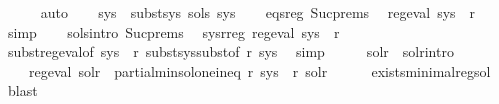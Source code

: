 \begin{isabellebody}
\ \ \ \ \isamarkupfalse%
\ auto\isanewline
\ \ \isamarkupfalse%
\ {\isacharquery}{\kern0pt}sys{\isacharprime}{\kern0pt}\ {\isacharequal}{\kern0pt}\ {\isachardoublequoteopen}subst{\isacharunderscore}{\kern0pt}sys\ sols\ sys{\isachardoublequoteclose}\isanewline
\ \ \isamarkupfalse%
\ eqs{\isacharunderscore}{\kern0pt}reg\ Suc{\isachardot}{\kern0pt}prems\ \isamarkupfalse%
\ {\isachardoublequoteopen}reg{\isacharunderscore}{\kern0pt}eval\ {\isacharparenleft}{\kern0pt}sys\ {\isacharbang}{\kern0pt}\ r{\isacharparenright}{\kern0pt}{\isachardoublequoteclose}\ \isamarkupfalse%
\ simp\isanewline
\ \ \isamarkupfalse%
\ sols{\isacharunderscore}{\kern0pt}intro\ Suc{\isachardot}{\kern0pt}prems\ \isamarkupfalse%
\ sys{\isacharunderscore}{\kern0pt}r{\isacharunderscore}{\kern0pt}reg{\isacharcolon}{\kern0pt}\ {\isachardoublequoteopen}reg{\isacharunderscore}{\kern0pt}eval\ {\isacharparenleft}{\kern0pt}{\isacharquery}{\kern0pt}sys{\isacharprime}{\kern0pt}\ {\isacharbang}{\kern0pt}\ r{\isacharparenright}{\kern0pt}{\isachardoublequoteclose}\isanewline
\ \ \ \ \isamarkupfalse%
\ subst{\isacharunderscore}{\kern0pt}reg{\isacharunderscore}{\kern0pt}eval{\isacharbrackleft}{\kern0pt}of\ {\isachardoublequoteopen}sys\ {\isacharbang}{\kern0pt}\ r{\isachardoublequoteclose}{\isacharbrackright}{\kern0pt}\ subst{\isacharunderscore}{\kern0pt}sys{\isacharunderscore}{\kern0pt}subst{\isacharbrackleft}{\kern0pt}of\ r\ sys{\isacharbrackright}{\kern0pt}\ \isamarkupfalse%
\ simp\isanewline
\ \ \isamarkupfalse%
\ \isamarkupfalse%
\ sol{\isacharunderscore}{\kern0pt}r\ \ sol{\isacharunderscore}{\kern0pt}r{\isacharunderscore}{\kern0pt}intro{\isacharcolon}{\kern0pt}\isanewline
\ \ \ \ {\isachardoublequoteopen}reg{\isacharunderscore}{\kern0pt}eval\ sol{\isacharunderscore}{\kern0pt}r\ {\isasymand}\ partial{\isacharunderscore}{\kern0pt}min{\isacharunderscore}{\kern0pt}sol{\isacharunderscore}{\kern0pt}one{\isacharunderscore}{\kern0pt}ineq\ r\ {\isacharparenleft}{\kern0pt}{\isacharquery}{\kern0pt}sys{\isacharprime}{\kern0pt}\ {\isacharbang}{\kern0pt}\ r{\isacharparenright}{\kern0pt}\ sol{\isacharunderscore}{\kern0pt}r{\isachardoublequoteclose}\isanewline
\ \ \ \ \isamarkupfalse%
\ exists{\isacharunderscore}{\kern0pt}minimal{\isacharunderscore}{\kern0pt}reg{\isacharunderscore}{\kern0pt}sol\ \isamarkupfalse%
\ blast\isanewline
\ \ \isamarkupfalse%

\end{isabellebody}
